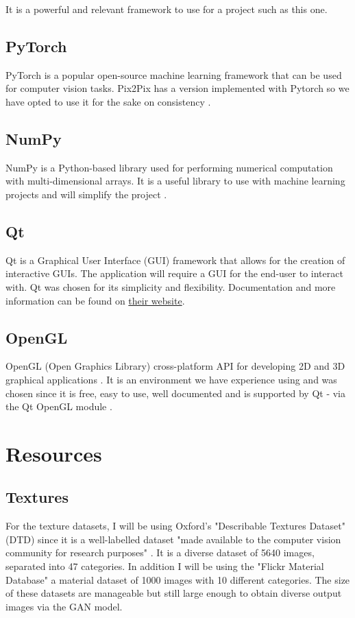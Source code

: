 \noindent It is a powerful and relevant framework to use for a project such as this one.

\subsection{PyTorch}
\label{subsec:pytorch}
PyTorch is a popular open-source machine learning framework that can be used for computer vision tasks. Pix2Pix has a version implemented with Pytorch so we have opted to use it for the sake on consistency \cite{pytorch}. 

\subsection{NumPy}
\label{subsec:numpy}
NumPy is a Python-based library used for performing numerical computation with multi-dimensional arrays. It is a useful library to use with machine learning projects and will simplify the project \cite{numpy}.

\subsection{Qt}
\label{subsec:qt}
Qt is a Graphical User Interface (GUI) framework that allows for the creation of interactive GUIs. The application will require a GUI for the end-user to interact with. Qt was chosen for its simplicity and flexibility. Documentation and more information can be found on \href{https://www.qt.io/}{their website}. 

\subsection{OpenGL}
\label{subsec:opengl}
OpenGL (Open Graphics Library) cross-platform API for developing 2D and 3D graphical applications \cite{openglabout}. It is an environment we have experience using and was chosen since it is free, easy to use, well documented and is supported by Qt - via the Qt OpenGL module \cite{qtopenglmodule}.

\section{Resources}
\label{sec:resources}
\subsection{Textures}
\label{subsec:textures}
For the texture datasets, I will be using Oxford's "Describable Textures Dataset" (DTD) \cite{cimpoi14describingtextures} since it is a well-labelled dataset "made available to the computer vision community for research purposes" \cite{describingtexturesweb}. It is a diverse dataset of 5640 images, separated into 47 categories. In addition I will be using the "Flickr Material Database" \cite{materialperceptiondataset} a material dataset of 1000 images with 10 different categories.
The size of these datasets are manageable but still large enough to obtain diverse output images via the GAN model.

